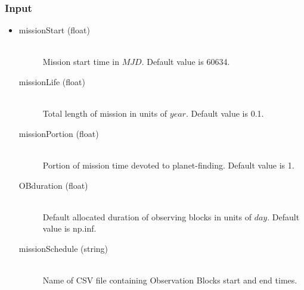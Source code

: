 \documentclass[cleanfoot]{asme2ej}
\begin{document}
\subsubsection*{Input}
\begin{itemize}
\item
\begin{description}
    \item[missionStart (float)] \hfill \\ Mission start time in $ MJD $. Default value is 60634.
    \item[missionLife (float)] \hfill \\ Total length of mission in units of $ year $. Default value is 0.1.
    \item[missionPortion (float)] \hfill \\ Portion of mission time devoted to planet-finding. Default value is 1.
    \item[OBduration (float)] \hfill \\ Default allocated duration of observing blocks in units of $day$. Default value is np.inf.
    \item[missionSchedule (string)] \hfill \\ Name of CSV file containing Observation Blocks start and end times.
\end{description}
\end{itemize}
\end{document}
